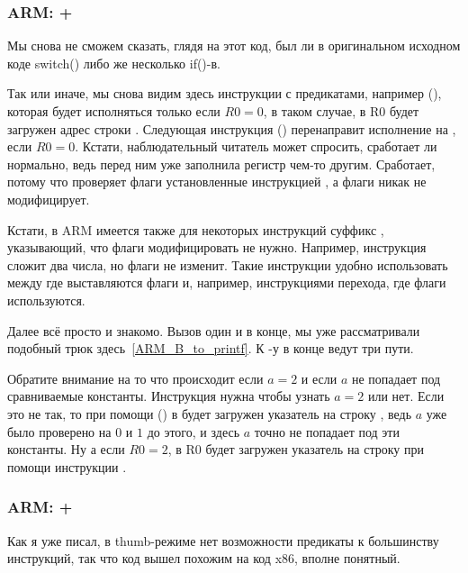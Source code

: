 ﻿\subsubsection{ARM: \OptimizingKeil + \ARMMode}



Мы снова не сможем сказать, глядя на этот код, был ли в оригинальном исходном коде switch() либо же несколько
if()-в.

Так или иначе, мы снова видим здесь инструкции с предикатами, например  (), 
которая будет исполняться только
если $R0=0$, в таком случае, в R0 будет загружен адрес строки . 
Следующая инструкция  () перенаправит
исполнение на , если $R0=0$. 
Кстати, наблюдательный читатель может спросить, сработает ли  нормально,
ведь  перед ним уже заполнила регистр \Rzero чем-то другим. 
Сработает, потому что  проверяет флаги установленные
инструкцией \CMP, а  флаги никак не модифицирует.

Кстати, в ARM имеется также для некоторых инструкций суффикс , указывающий, что флаги модифицировать не нужно.
Например, инструкция  сложит два числа, но флаги не изменит. Такие инструкции удобно использовать
между \CMP где выставляются флаги и, например, инструкциями перехода, где флаги используются.

Далее всё просто и знакомо. Вызов \printf один и в конце, мы уже рассматривали подобный трюк 
здесь~\ref{ARM_B_to_printf}. К \printf{}-у в конце ведут три пути. 

Обратите внимание на то что происходит
если $a=2$ и если $a$ не попадает под сравниваемые константы. Инструкция  нужна чтобы узнать
$a=2$ или нет. Если это не так, то при помощи  () в \Rzero будет загружен указатель на 
строку ,
ведь $a$ уже было проверено на $0$ и $1$ до этого, и здесь $a$ точно не попадает под эти константы. 
Ну а если $R0=2$,
в R0 будет загружен указатель на строку  при помощи инструкции .

\subsubsection{ARM: \OptimizingKeil + \ThumbMode}



Как я уже писал, в thumb-режиме нет возможности  предикаты к большинству инструкций,
так что код вышел похожим на код x86, вполне понятный.


